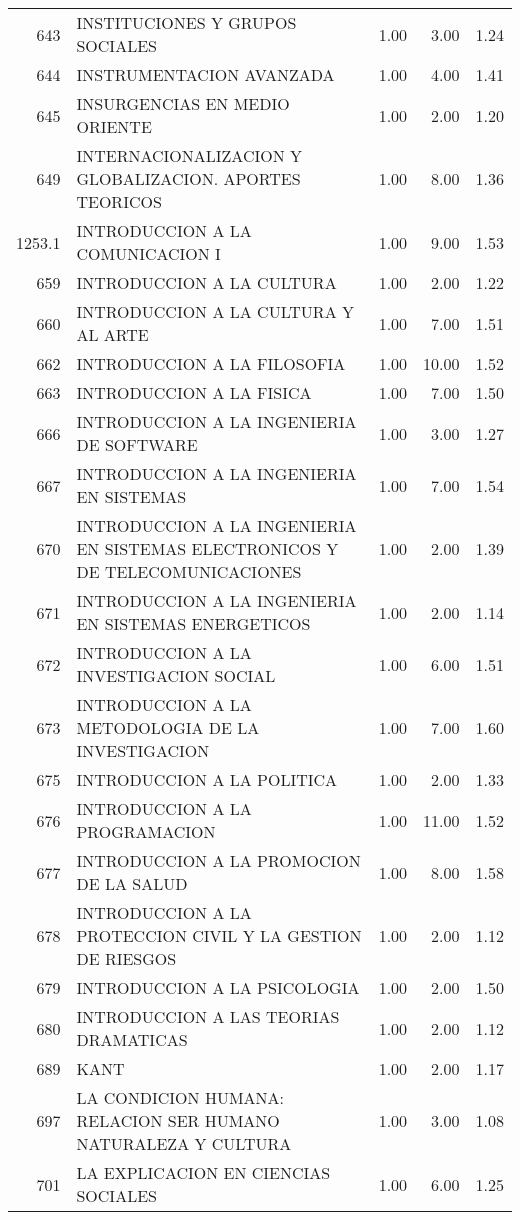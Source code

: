 \documentclass[12pt]{article}
\begin{document}
\begin{table}[ht]
\begin{tabular}{rlrrr}
  643 & INSTITUCIONES Y GRUPOS SOCIALES & 1.00 & 3.00 & 1.24 \\ 
  644 & INSTRUMENTACION AVANZADA & 1.00 & 4.00 & 1.41 \\ 
  645 & INSURGENCIAS EN MEDIO ORIENTE & 1.00 & 2.00 & 1.20 \\ 
  649 & INTERNACIONALIZACION Y GLOBALIZACION. APORTES TEORICOS & 1.00 & 8.00 & 1.36 \\ 
  1253.1 & INTRODUCCION A LA COMUNICACION I & 1.00 & 9.00 & 1.53 \\ 
  659 & INTRODUCCION A LA CULTURA & 1.00 & 2.00 & 1.22 \\ 
  660 & INTRODUCCION A LA CULTURA Y AL ARTE & 1.00 & 7.00 & 1.51 \\ 
  662 & INTRODUCCION A LA FILOSOFIA & 1.00 & 10.00 & 1.52 \\ 
  663 & INTRODUCCION A LA FISICA & 1.00 & 7.00 & 1.50 \\ 
  666 & INTRODUCCION A LA INGENIERIA DE SOFTWARE & 1.00 & 3.00 & 1.27 \\ 
  667 & INTRODUCCION A LA INGENIERIA EN SISTEMAS & 1.00 & 7.00 & 1.54 \\ 
  670 & INTRODUCCION A LA INGENIERIA EN SISTEMAS ELECTRONICOS Y DE TELECOMUNICACIONES & 1.00 & 2.00 & 1.39 \\ 
  671 & INTRODUCCION A LA INGENIERIA EN SISTEMAS ENERGETICOS & 1.00 & 2.00 & 1.14 \\ 
  672 & INTRODUCCION A LA INVESTIGACION SOCIAL & 1.00 & 6.00 & 1.51 \\ 
  673 & INTRODUCCION A LA METODOLOGIA DE LA INVESTIGACION & 1.00 & 7.00 & 1.60 \\ 
  675 & INTRODUCCION A LA POLITICA & 1.00 & 2.00 & 1.33 \\ 
  676 & INTRODUCCION A LA PROGRAMACION & 1.00 & 11.00 & 1.52 \\ 
  677 & INTRODUCCION A LA PROMOCION DE LA SALUD & 1.00 & 8.00 & 1.58 \\ 
  678 & INTRODUCCION A LA PROTECCION CIVIL Y LA GESTION DE RIESGOS & 1.00 & 2.00 & 1.12 \\ 
  679 & INTRODUCCION A LA PSICOLOGIA & 1.00 & 2.00 & 1.50 \\ 
  680 & INTRODUCCION A LAS TEORIAS DRAMATICAS & 1.00 & 2.00 & 1.12 \\ 
  689 & KANT & 1.00 & 2.00 & 1.17 \\ 
  697 & LA CONDICION HUMANA: RELACION SER HUMANO NATURALEZA Y CULTURA & 1.00 & 3.00 & 1.08 \\ 
  701 & LA EXPLICACION EN CIENCIAS SOCIALES & 1.00 & 6.00 & 1.25 \\ 

\end{tabular}
\end{table}
\end{document}
